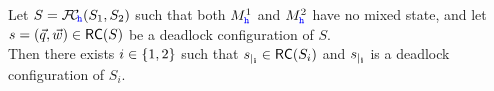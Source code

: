 %
%
%


\begin{lemma}
\label{lem:weakdfpreservation}
Let $S = {\mathcal{F}\!\mathcal{C}}_{\!{\mathtt{\color{blue}{ {h}}}}}(S_1,S_2)$ such that
both $M^1_{\mathtt{\color{blue}{ {h}}}}$ and $M^2_{\mathtt{\color{blue}{ {h}}}}$ have no mixed state, and
let $s= (\vec{q},\vec{w}) \in \mathsf{RC}(S)$ be a deadlock configuration of $S$.\\
Then there exists $i\in \{1,2\}$ such that ${s}_{\mid_{\mathbf{i}}}\in \mathsf{RC}(S_i)$ and ${s}_{\mid_{\mathbf{i}}}$
is a deadlock configuration of $S_i$.
\end{lemma}

